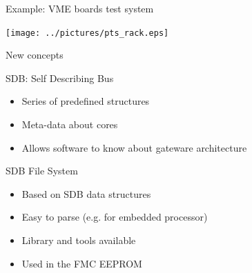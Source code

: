 \documentclass[compress,red]{beamer}
\begin{document}
\begin{frame}{Example: VME boards test system}

  \begin{center}
    \texttt{[image: ../pictures/pts\_rack.eps]}
  \end{center}

  \note[item]{}

\end{frame}

\begin{frame}{New concepts}

  \begin{block}{SDB: Self Describing Bus}
    \begin{itemize}
    \item Series of predefined structures
    \item Meta-data about cores
    \item Allows software to know about gateware architecture
    \end{itemize}
  \end{block}

  \begin{block}{SDB File System}
    \begin{itemize}
    \item Based on SDB data structures
    \item Easy to parse (e.g. for embedded processor)
    \item Library and tools available %
    \item Used in the FMC EEPROM
    \end{itemize}
  \end{block}

  \note[item]{}

\end{frame}

\end{document}

